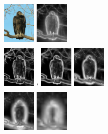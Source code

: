 \documentclass[10pt,twocolumn,letterpaper]{article}
\begin{document}
\begin{figure}[h]
\begin{center}    
\includegraphics[width=0.65in,height=0.9in]{./Figures/pyramid/5_145_145839raw.jpg} %
\includegraphics[width=0.65in,height=0.9in]{./Figures/pyramid/5_145_145839.jpg} \\[0.5mm]
\includegraphics[width=0.65in,height=0.9in]{./Figures/pyramid/5_145_145839_p0.jpg} `
\includegraphics[width=0.65in,height=0.9in]{./Figures/pyramid/5_145_145839_p1.jpg} 
\includegraphics[width=0.65in,height=0.9in]{./Figures/pyramid/5_145_145839_p2.jpg}\\[0.5mm]
\includegraphics[width=0.65in,height=0.9in]{./Figures/pyramid/5_145_145839_p3.jpg} 
\includegraphics[width=0.65in,height=0.9in]{./Figures/pyramid/5_145_145839_p4.jpg}

\end{center}
\end{figure}
\end{document}
